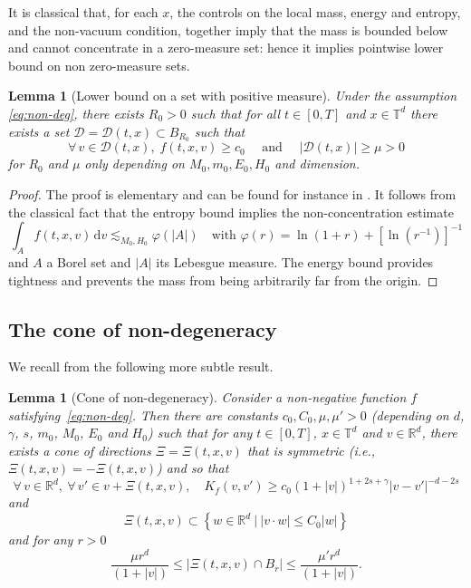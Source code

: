 \documentclass[11pt]{article}
\newcommand{\ie}{i.e.,\xspace}
\theoremstyle{plain}
\newtheorem{lemma}[thm]{Lemma}
\theoremstyle{definition}
\numberwithin{equation}{section}
\newcommand{\R}{\mathbb R}
\newcommand{\dd} {\, \mathrm{d}}
\newcommand{\angulars}{{2s}}
\begin{document}
It is classical that, for each $x$, the controls on the local mass,
energy and entropy, and the non-vacuum condition, together imply that
the mass is bounded below and cannot concentrate in a zero-measure
set: hence it implies pointwise lower bound on non zero-measure sets.

\begin{lemma}[Lower bound on a set with positive
measure] \label{lem:D} Under the assumption \eqref{eq:non-deg},
there exists $R_0>0$ such that for all $t \in [0,T]$ and
$x \in \mathbb{T}^d$ there exists a set
$\mathcal{D} = \mathcal{D}(t,x) \subset B_{R_0}$ such that
\[ \forall \, v \in \mathcal{D}(t,x), \; f(t,x,v) \ge c_0 \quad \text{ and } \quad
|\mathcal{D}(t,x)| \ge \mu >0 \]
for $R_0$ and $\mu$ only depending on $M_0,m_0,E_0,H_0$ and
dimension.
\end{lemma}

\begin{proof}
The proof is elementary and can be found for instance in
\cite[Lem.\,4.6]{luis}. It follows from the classical fact that the
entropy bound implies the non-concentration estimate
\[
\int_A f(t,x,v) \dd v \lesssim_{M_0,H_0} \varphi(|A|) \quad \mbox{
with } \varphi(r) = \ln(1+r) + \left[ \ln\left(r^{-1}\right) \right]^{-1}
\]
and $A$ a Borel set and $|A|$ its Lebesgue measure. The energy bound
provides tightness and prevents the mass from being arbitrarily far
from the origin.
\end{proof}

\subsection{The cone of non-degeneracy}

We recall from \cite{luis,is} the following more subtle result.

\begin{lemma}[Cone of non-degeneracy]\label{lem:cone-nd}
Consider a non-negative function $f$
satisfying~\eqref{eq:non-deg}. Then there are constants
$c_0,C_0,\mu, \mu'>0$ (depending on $d$, $\gamma$, $s$, $m_0$,
$M_0$, $E_0$ and $H_0$) such that for any $t \in [0,T]$,
$x \in \mathbb T^d$ and $v \in \R^d$, there exists a cone of
directions $\Xi = \Xi(t,x,v)$ that is symmetric
(\ie $\Xi(t,x,v) = -\Xi(t,x,v)$) and so that
\[
\forall \, v \in \R^d, \ \forall \, v' \in v+\Xi(t,x,v), \quad K_f(v,v') \geq c_0 (1+|v|)^{1+\angulars+\gamma}
|v-v'|^{-d-\angulars}
\]
and
\[
\Xi(t,x,v) \subset \left\{ w \in \R^d \ | \ |v \cdot w| \le C_0
|w|\right\}
\]
and for any $r >0$
\begin{equation}\label{eq:cone-estim}
\frac{\mu r^d}{(1+|v|)} \le \left|\Xi(t,x,v) \cap B_r\right| \le
\frac{\mu' r^d}{(1+|v|)}.
\end{equation}
\end{lemma}
\end{document}
